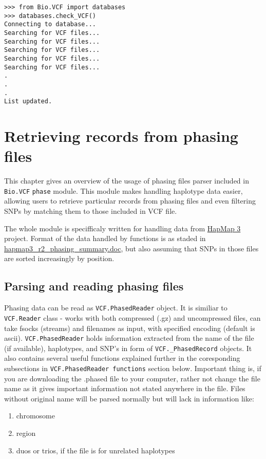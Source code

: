 \begin{verbatim}
>>> from Bio.VCF import databases
>>> databases.check_VCF()
Connecting to database...
Searching for VCF files...
Searching for VCF files...
Searching for VCF files...
Searching for VCF files...
Searching for VCF files...
.
.
.
List updated.
\end{verbatim}
    
    
\section {Retrieving records from phasing files}

This chapter gives an overview of the usage of phasing files parser included in \verb|Bio.VCF| \verb|phase| module.
This module makes handling haplotype data easier, allowing users to retrieve particular records from phasing files
and even filtering SNPs by matching them to those included in VCF file.

The whole module is specifficaly written for handling data from \href{ftp://ftp.hapmap.org/hapmap/phasing/2009-02\_phaseIII/HapMap3\_r2/}{HapMap 3} project.
Format of the data handled by functions is as staded in \href{ftp://ftp.hapmap.org/hapmap/phasing/2009-02\_phaseIII/HapMap3\_r2/hapmap3\_r2\_phasing\_summary.doc}{hapmap3\_r2\_phasing\_summary.doc},
but also assuming that SNPs in those files are sorted increasingly by position.


\subsection{Parsing and reading phasing files}

Phasing data can be read as \verb|VCF.PhasedReader| object. It is similiar to \verb|VCF.Reader| class - works with both compressed (.gz) and
uncompressed files, can take fsocks (streams) and filenames as input, with specified encoding (default is ascii).
\verb|VCF.PhasedReader| holds information extracted from the name of the file (if available), haplotypes, and SNP's in form of \verb|VCF._PhasedRecord| objects.
It also contains several useful functions explained further in the coresponding subsections in \verb|VCF.PhasedReader functions| section below.
Important thing is, if you are downloading the .phased file to your computer, rather not change the file name as it gives important
information not stated anywhere in the file. Files without original name will be parsed normally but will lack in information like:
\begin{enumerate}
  \item chromosome
  \item region
  \item duos or trios, if the file is for unrelated haplotypes
  \end{enumerate}


